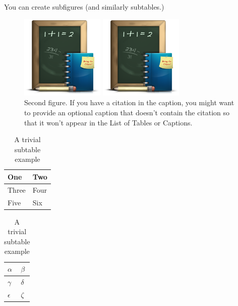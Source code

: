 You can create subfigures (and similarly subtables.)

\begin{figure}[hbt!]
\begin{minipage}{0.48\textwidth}
  \centering
  \includegraphics[width=4cm]{school}
\end{minipage}
%
\hfill
%
\begin{minipage}{0.48\textwidth}
  \centering
  \includegraphics[width=4cm]{school}
\end{minipage}

\caption[Second figure (caption without citation)]{Second figure.  If you have a citation in the caption, you might want to provide an optional caption that doesn't contain the citation so that it won't appear in the List of Tables or Captions. \cite{audibert:2004}}
\end{figure}



\begin{table}[hbt!]
\caption{A trivial subtable example}

\begin{minipage}{.49\textwidth}
\centering
{}

\begin{tabular}{l l}
  \hline
  One & Two \\
  \hline
  Three & Four\\
  Five & Six\\
  \hline
\end{tabular}
\end{minipage}
%
\hfill
%
\begin{minipage}{0.49\textwidth}
\centering
{}

\begin{tabular}{l l}
  \hline
  $\alpha$ & $\beta$ \\
  \hline
  $\gamma$ & $\delta$\\
  $\epsilon$ & $\zeta$\\
  \hline
\end{tabular}
\end{minipage}

\end{table}

